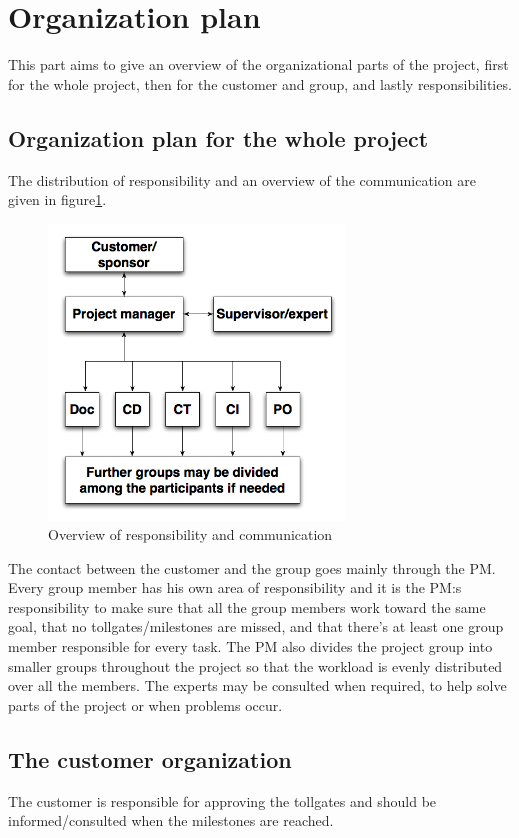 \section{Organization plan} %
This part aims to give an overview of the organizational parts of the project, first for the whole project, then for the customer and group, and lastly responsibilities.
\subsection{Organization plan for the whole project}
The distribution of responsibility and an overview of the communication are given in figure\ref{FlowOrg}.
\begin{figure}[h]
	\centering
		\includegraphics[width=0.7\textwidth]{Images/FlowChart_Org.png}
		\caption{Overview of responsibility and communication}
		\label{FlowOrg}
\end{figure}
The contact between the customer and the group goes mainly through the PM. Every group member has his own area of responsibility and it is the PM:s responsibility to make sure that all the group members work toward the same goal, that no tollgates/milestones are missed, and that there's at least one group member responsible for every task. The PM also divides the project group into smaller groups throughout the project so that the workload is evenly distributed over all the members. The experts may be consulted when required, to help solve parts of the project or when problems occur.
\subsection{The customer organization}
The customer is responsible for approving the tollgates and should be informed/consulted when the milestones are reached.
